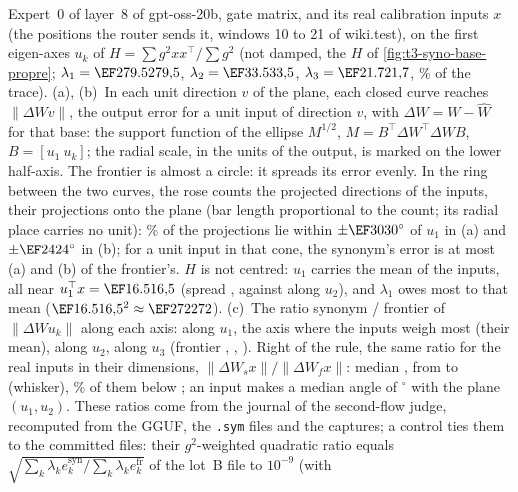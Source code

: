 {Expert~0 of layer~8 of gpt-oss-20b, gate matrix, and its \LatNuageN{} real calibration inputs $x$ (the positions the
router sends it, windows 10 to 21 of wiki.test), on the first eigen-axes $u_k$ of $H=\sum g^2xx^\top/\sum g^2$ (not
damped, the $H$ of \cref{fig:t3-syno-base-propre}; $\lambda_1=\LatNuageLambdaUn$, $\lambda_2=\LatNuageLambdaDeux$,
$\lambda_3=\LatNuageLambdaTrois$, \LatNuagePartTrace\% of the trace). (a), (b)~In each unit direction $v$ of the plane,
each closed curve reaches $\lVert\Delta W v\rVert$, the output error for a unit input of direction $v$, with $\Delta
W=W-\hat W$ for that base: the support function of the ellipse $M^{1/2}$, $M=B^\top\Delta W^\top\Delta W B$,
$B=[u_1\ u_k]$; the radial scale, in the units of the output, is marked on the lower half-axis. The frontier is almost a
circle: it spreads its error evenly. In the ring between the two curves, the rose counts the projected directions of
the inputs, their projections onto the plane (bar length proportional to the count; its radial place carries no unit):
\LatNuageConeQuantile\% of the projections lie within $\pm\LatNuageConeDouze^\circ$ of $u_1$ in (a) and
$\pm\LatNuageConeTreize^\circ$ in (b); for a unit input in that cone, the synonym's error is at most
\LatNuageConeRapportDouze{} (a) and \LatNuageConeRapportTreize{} (b) of the frontier's. $H$ is not centred: $u_1$ carries the mean of the inputs, all near
$u_1^\top x=\LatNuageMoyUn$ (spread \LatNuageEcartUn, against \LatNuageEcartDeux{} along $u_2$), and $\lambda_1$ owes
most to that mean ($\LatNuageMoyUn^2\approx\LatNuageMoyCarre$). (c)~The ratio synonym / frontier of $\lVert\Delta W
u_k\rVert$ along each axis: \LatNuageRapportUn{} along $u_1$, the axis where the inputs weigh most (their mean),
\LatNuageRapportDeux{} along $u_2$, \LatNuageRapportTrois{} along $u_3$ (frontier \LatNuageErrFUn,
\LatNuageErrFDeux, \LatNuageErrFTrois). Right of the rule, the same ratio for the \LatNuageN{} real inputs in their
\LatDim{} dimensions, $\lVert\Delta W_s x\rVert/\lVert\Delta W_f x\rVert$: median \LatNuageEntreesMed, from
\LatNuageEntreesMin{} to \LatNuageEntreesMax{} (whisker), \LatNuageEntreesSousTete\% of them below
\LatNuageConeRapport; an input makes a median angle of \LatNuageAngleMed$^\circ$ with the plane $(u_1, u_2)$. These
ratios come from the journal of the second-flow judge, recomputed from the GGUF, the \texttt{.sym} files and the
captures; a control ties them to the committed files: their $g^2$-weighted quadratic ratio equals
$\sqrt{\sum_k\lambda_k e_k^{\mathrm{syn}}/\sum_k\lambda_k e_k^{\mathrm{fr}}}$ of the lot~B file to $10^{-9}$ (with
}
